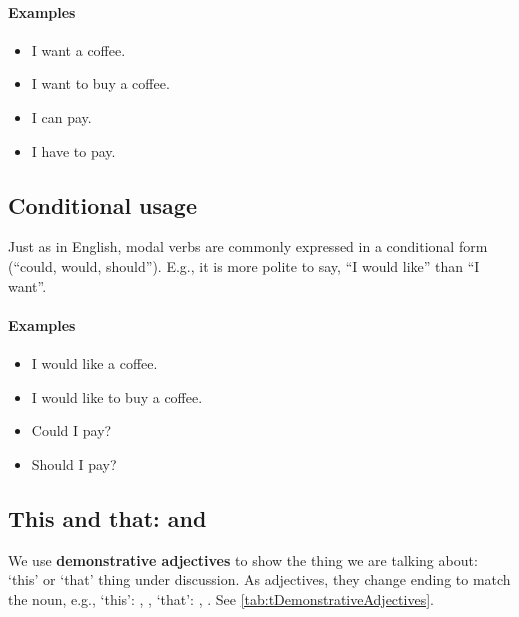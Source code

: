 \paragraph{Examples}
\begin{itemize}
    \item I want a coffee. \\

    \item I want to buy a coffee. \\

    \item I can pay. \\

    \item I have to pay. \\
\end{itemize}

\subsection{Conditional usage}
Just as in English, modal verbs are commonly expressed in a conditional form 
(``could, would, should''). E.g., it is more polite to say, ``I would like'' than ``I want''.

\paragraph{Examples}
\begin{itemize}
    \item I would like a coffee. \\

    \item I would like to buy a coffee. \\

    \item Could I pay? \\

    \item Should I pay? \\
\end{itemize}

\subsection{This and that:  and }
We use \textbf{demonstrative adjectives} to show the thing we are talking about: 
`this' or `that' thing under discussion. As adjectives, they change ending to 
match the noun, e.g., `this': , , `that': ,
. See \ref{tab:tDemonstrativeAdjectives}.

